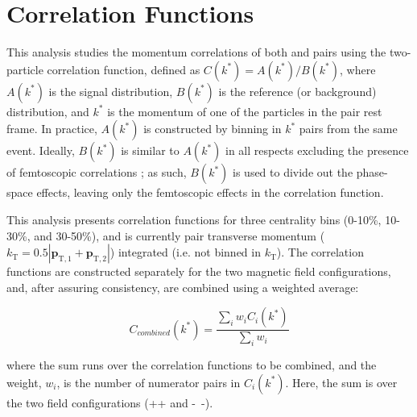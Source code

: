 \documentclass[../AnalysisNoteJBuxton.tex]{subfiles}
\begin{document}
\section{Correlation Functions}
\label{CorrelationFunctions}


This analysis studies the momentum correlations of both \LamK and \XiKpm pairs using the two-particle correlation function, defined as $C(k^{*}) = A(k^{*})/B(k^{*})$, where $A(k^{*})$ is the signal distribution, $B(k^{*})$ is the reference (or background) distribution, and $k^{*}$ is the momentum of one of the particles in the pair rest frame.
In practice, $A(k^{*})$ is constructed by binning in $k^{*}$ pairs from the same event.
Ideally, $B(k^{*})$ is similar to $A(k^{*})$ in all respects excluding the presence of femtoscopic correlations \cite{Lisa:2005dd}; as such, $B(k^{*})$ is used to divide out the phase-space effects, leaving only the femtoscopic effects in the correlation function. 

This analysis presents correlation functions for three centrality bins (0-10\%, 10-30\%, and 30-50\%), and is currently pair transverse momentum ($k_{\mathrm{T}} = 0.5|\mathbf{p}_{\mathrm{T},1}+\mathbf{p}_{\mathrm{T},2}|$) integrated (i.e. not binned in $k_{\mathrm{T}}$).  
The correlation functions are constructed separately for the two magnetic field configurations, and, after assuring consistency, are combined using a weighted average:

\begin{equation}
  C_{combined}(k^{*}) = \frac{\sum\limits_{i}w_{i}C_{i}(k^{*})}{\sum\limits_{i}w_{i}} 
\label{eqn:CombineCfs}
\end{equation}

where the sum runs over the correlation functions to be combined, and the weight, $w_{i}$, is the number of numerator pairs in $C_{i}(k^{*})$.
Here, the sum is over the two field configurations (++ and -~-).




\clearpage
\end{document}
